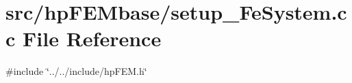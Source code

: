 \section{src/hp\+F\+E\+Mbase/setup\+\_\+\+Fe\+System.cc File Reference}
\label{setup___fe_system_8cc}
{\ttfamily \#include \char`\"{}../../include/hp\+F\+E\+M.\+h\char`\"{}}\newline
